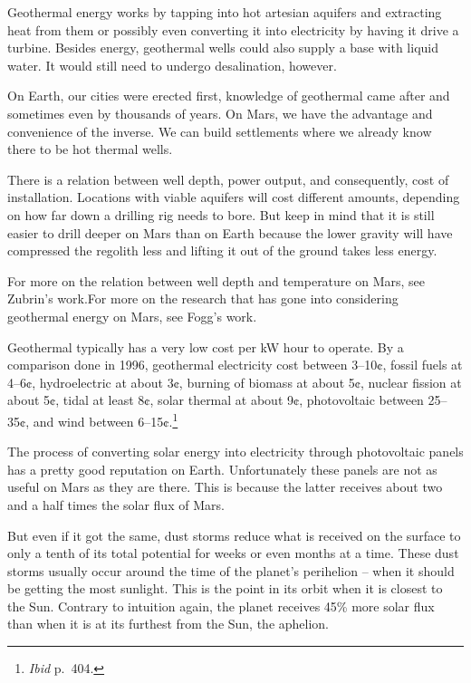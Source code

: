 Geothermal energy works by tapping into hot artesian aquifers and extracting heat from them or possibly even converting it into electricity by having it drive a turbine. Besides energy, geothermal wells could also supply a base with liquid water. It would still need to undergo desalination, however.

On Earth, our cities were erected first, knowledge of geothermal came after and sometimes even by thousands of years. On Mars, we have the advantage and convenience of the inverse. We can build settlements where we already know there to be hot thermal wells.

There is a relation between well depth, power output, and consequently, cost of installation. Locations with viable aquifers will cost different amounts, depending on how far down a drilling rig needs to bore. But keep in mind that it is still easier to drill deeper on Mars than on Earth because the lower gravity will have compressed the regolith less and lifting it out of the ground takes less energy.

For more on the relation between well depth and temperature on Mars, see Zubrin's work. For more on the research that has gone into considering geothermal energy on Mars, see Fogg's work.\footnotecite[fogg1996]

Geothermal typically has a very low cost per kW hour to operate. By a comparison done in 1996, geothermal electricity cost between 3--10¢, fossil fuels at 4--6¢, hydroelectric at about 3¢, burning of biomass at about 5¢, nuclear fission at about 5¢, tidal at least 8¢, solar thermal at about 9¢, photovoltaic between 25--35¢, and wind between 6--15¢.\footnote{{\it Ibid} p.~404.}

The process of converting solar energy into electricity through photovoltaic panels has a pretty good reputation on Earth. Unfortunately these panels are not as useful on Mars as they are there. This is because the latter receives about two and a half times the solar flux of Mars.

But even if it got the same, dust storms reduce what is received on the surface to only a tenth of its total potential for weeks or even months at a time. These dust storms usually occur around the time of the planet's perihelion -- when it should be getting the most sunlight. This is the point in its orbit when it is closest to the Sun. Contrary to intuition again, the planet receives 45\% more solar flux than when it is at its furthest from the Sun, the aphelion. 

